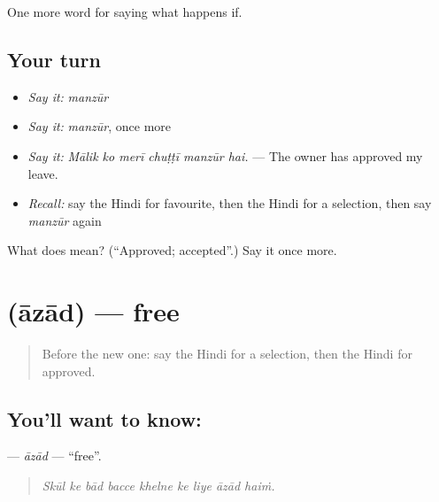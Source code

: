 \begin{grammarlens}[title={What you've built}]
One more word for saying what happens if.
\end{grammarlens}

\subsection*{Your turn}
\begin{itemize}
\raggedright
  \item \emph{Say it:} \emph{manzūr}
  \item \emph{Say it:} \emph{manzūr}, once more
  \item \emph{Say it:} \emph{Mālik ko merī chuṭṭī manzūr hai.} — The owner has approved my leave.
  \item \emph{Recall:} say the Hindi for favourite, then the Hindi for a selection, then say \emph{manzūr} again
\end{itemize}

\begin{tcolorbox}[breakable,colback=teal!4,colframe=teal!35!black,title={Before you move on}]
What does  mean? (\textquotedblleft{}Approved; accepted\textquotedblright{}.) Say it once more.
\end{tcolorbox}
\section[\texorpdfstring{\hi{आज़ाद} (āzād)}{आज़ाद (āzād)}]{ (āzād) — free}

\label{lesson:HI-C551-azad}



\begin{quote}
Before the new one: say the Hindi for a selection, then the Hindi for approved.
\end{quote}

\subsection*{You'll want to know: }
\textbf{} — \emph{āzād} — \textquotedblleft{}free\textquotedblright{}.

\begin{quote}
        
\end{quote}

\begin{quote}
\emph{Skūl ke bād bacce khelne ke liye āzād haiṁ.}
\end{quote}

